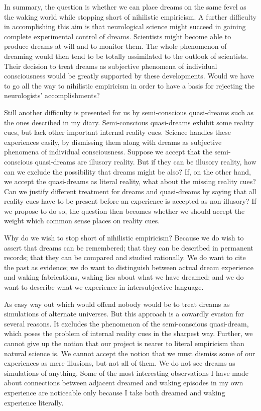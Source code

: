 \documentclass[10pt,twoside,draft]{memoir}
\begin{document}
{{In summary, the question is whether we can place dreams on the same 
fevel as the waking world while stopping short of nihilistic empiricism. A 
further difficulty in accomplishing this aim is that neurological science might 
succeed in gaining complete experimental control of dreams. Scientists might 
become able to produce dreams at will and to monitor them. The whole 
phenomenon of dreaming would then tend to be totally assimilated to the 
outlook of scientists. Their decision to treat dreams as subjective phenomena 
of individual consciousness would be greatly supported by these 
developments. Would we have to go all the way to nihilistic empiricism in 
order to have a basis for rejecting the neurologists' accomplishments? 

Still another difficulty is presented for us by semi-conscious 
quasi-dreams such as the ones described in my diary. Semi-conscious 
quasi-dreams exhibit some reality cues, but lack other important internal 
reality cues. Science handles these experiences easily, by dismissing them 
along with dreams as subjective phenomena of individual consciousness. 
Suppose we accept that the semi-conscious quasi-dreams are illusory reality. 
But if they can be illusory reality, how can we exclude the possibility that 
dreams might be also? If, on the other hand, we accept the quasi-dreams as 
literal reality, what about the missing reality cues? Can we justify different 
treatment for dreams and quasi-dreams by saying that all reality cues have to 
be present before an experience is accepted as non-illusory? If we propose 
to do so, the question then becomes whether we should accept the weight 
which common sense places on reality cues. 

Why do we wish to stop short of nihilistic empiricism? Because we do 
wish to assert that dreams can be remembered; that they can be described in 
permanent records; that they can be compared and studied rationally. We do 
want to cite the past as evidence; we do want to distinguish between actual 
dream experience and waking fabrications, waking lies about what we have 
dreamed; and we do want to describe what we experience in intersubjective 
language.

As easy way out which would offend nobody would be to treat dreams 
as simulations of alternate universes. But this approach is a cowardly evasion 
for several reasons. It excludes the phenomenon of the semi-conscious 
quasi-dream, which poses the problem of internal reality cues in the sharpest 
way. Further, we cannot give up the notion that our project is nearer to 
literal empiricism than natural science is. We cannot accept the notion that 
we must dismiss some of our experiences as mere illusions, but not all of 
them. We do not see dreams as simulations of anything. Some of the most 
interesting observations I have made about connections between adjacent 
dreamed and waking episodes in my own experience are noticeable only 
because I take both dreamed and waking experience literally. 

}}
\end{document}
